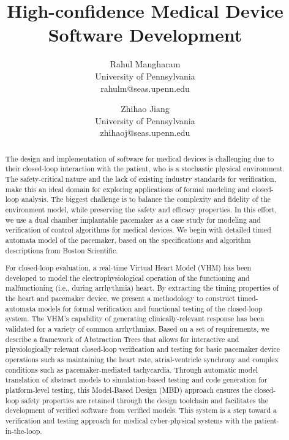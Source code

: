 \documentclass[openany]{now} %
\title{High-confidence Medical Device Software Development}
\author{
Rahul Mangharam \\
University of Pennsylvania\\
rahulm@seas.upenn.edu\and Zhihao Jiang \\
University of Pennsylvania\\
zhihaoj@seas.upenn.edu}
\begin{document}

\frontmatter  %

\maketitle

\tableofcontents

\mainmatter

\begin{abstract}
The design and implementation of software for medical devices is challenging due to their closed-loop interaction with the patient, who is a stochastic physical environment. The safety-critical nature and the lack of existing industry standards for verification, make this an ideal domain for exploring applications of formal modeling and closed-loop analysis. The biggest challenge is to balance the complexity and fidelity of the environment model, while preserving the safety and efficacy properties. In this effort, we use a dual chamber implantable pacemaker as a case study for modeling and verification of control algorithms for medical devices. We begin with detailed timed automata model of the pacemaker, based on the specifications and algorithm descriptions from Boston Scientific. 

For closed-loop evaluation, a real-time Virtual Heart Model (VHM) has been developed to model the electrophysiological operation of the functioning and malfunctioning (i.e., during arrhythmia) heart. By extracting the timing properties of the heart and pacemaker device, we present a methodology to construct timed-automata models for formal verification and functional testing of the closed-loop system. The VHM's capability of generating clinically-relevant response has been validated for a variety of common arrhythmias. Based on a set of requirements, we describe a framework of Abstraction Trees that allows for interactive and physiologically relevant closed-loop verification and testing
 for basic pacemaker device operations such as maintaining the heart rate, atrial-ventricle synchrony and complex conditions such as pacemaker-mediated tachycardia. Through automatic model translation of abstract models to simulation-based testing and code generation for platform-level testing, this Model-Based Design (MBD) approach ensures the closed-loop safety properties are retained through the design toolchain and facilitates the development of verified software from verified models.
 This system is a step toward a verification and testing approach for medical cyber-physical systems with the patient-in-the-loop.

\end{abstract}







%






\backmatter







\end{document}
